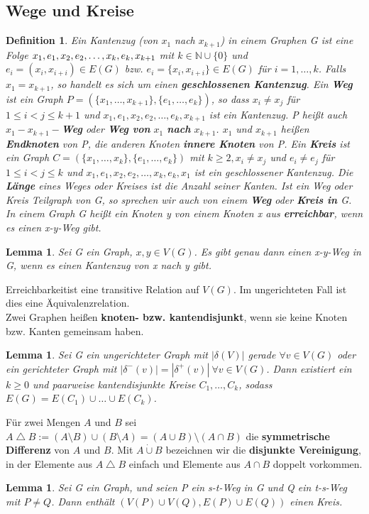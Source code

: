 \documentclass[12pt,a4paper]{article}
\theoremstyle{plain}
\newtheorem{Lemma}[Theorem]{Lemma}
\newtheorem{Definition}[Theorem]{Definition}
\newcommand{\herv}[1]{{\emph{\textbf{#1}}}}
\newcommand{\N}{\mathbb{N}}
\numberwithin{equation}{section}
\begin{document}
\subsection{Wege und Kreise}
\begin{Definition}
Ein Kantenzug (von $x_1$ nach $x_{k+1}$) in einem Graphen G ist eine Folge $x_1, e_1,\\ x_2, e_2, \ldots, x_k, e_k, x_{k+1}$ mit $k\in \N\cup\{0\}$ und $e_i=(x_i,x_{i+i})\in E(G)$ bzw. $e_i=\{x_i,x_{i+i}\}\in E(G)$ für $i=1,\ldots,k$. Falls $x_1=x_{k+1}$, so handelt es sich um einen \herv{geschlossenen Kantenzug}. Ein \herv{Weg} ist ein Graph $P=(\{x_1,\ldots,x_{k+1}\},\{e_1,\ldots,e_k\})$, so dass $x_i\neq x_j$ für $1\leq i < j\leq k+1$ und $x_1,e_1,x_2,e_2,\ldots,e_k,x_{k+1}$ ist ein Kantenzug. P heißt auch \herv{$x_1-x_{k+1}-$Weg} oder \herv{Weg von} $x_1$ \herv{nach} $x_{k+1}$. $x_1$ und $x_{k+1}$ heißen \herv{Endknoten} von P, die anderen Knoten \herv{innere Knoten} von P. Ein \herv{Kreis} ist ein Graph $C=(\{x_1,\ldots,x_k\},\{e_1,\ldots,e_k\})$ mit $k\geq 2, x_i\neq x_j$ und $e_i\neq e_j$ für $1\leq i < j\leq k$ und $x_1,e_1,x_2,e_2,\ldots,x_k,e_k,x_1$ ist ein geschlossener Kantenzug. Die \herv{Länge} eines Weges oder Kreises ist die Anzahl seiner Kanten. Ist ein Weg oder Kreis Teilgraph von G, so sprechen wir auch von einem \herv{Weg} oder \herv{Kreis in} G. In einem Graph G heißt ein Knoten y von einem Knoten x aus \herv{erreichbar}, wenn es einen x-y-Weg gibt.
\end{Definition}
\begin{Lemma}
Sei G ein Graph, $x,y\in V(G)$. Es gibt genau dann einen x-y-Weg in G, wenn es einen Kantenzug von x nach y gibt.
\end{Lemma}
\glqq Erreichbarkeit\grqq ist eine transitive Relation auf $V(G)$. Im ungerichteten Fall ist dies eine Äqui\-va\-lenz\-re\-la\-tion.\\
Zwei Graphen heißen \textbf{knoten- bzw. kantendisjunkt}, wenn sie keine Knoten bzw. Kanten gemeinsam haben.
\begin{Lemma}
Sei G ein ungerichteter Graph mit $|\delta(V)|$ gerade $\forall v \in V(G)$ oder ein gerichteter Graph mit $|\delta^-(v)|=|\delta^+(v)|\ \forall v\in V(G)$. Dann existiert ein $k\geq 0$ und paarweise kantendisjunkte Kreise $C_1,\ldots,C_k$, sodass $E(G)=E(C_1)\cup \ldots \cup E(C_k)$.
\end{Lemma}
Für zwei Mengen $A$ und $B$ sei $A \bigtriangleup B := (A\setminus B)\cup (B\setminus A)=(A\cup B)\setminus(A\cap B)$ die \textbf{symmetrische Differenz} von $A$ und $B$. Mit $A \mathbin{\dot{\cup}} B$ bezeichnen wir die \textbf{disjunkte Vereinigung}, in der Elemente aus $A \bigtriangleup B$ einfach und Elemente aus $A\cap B$ doppelt vorkommen.
\begin{Lemma}
Sei G ein Graph, und seien P ein s-t-Weg in G und Q ein t-s-Weg mit $P\neq Q$. Dann enthält $(V(P)\cup V(Q),E(P)\cup E(Q))$ einen Kreis.
\end{Lemma}
\end{document}

